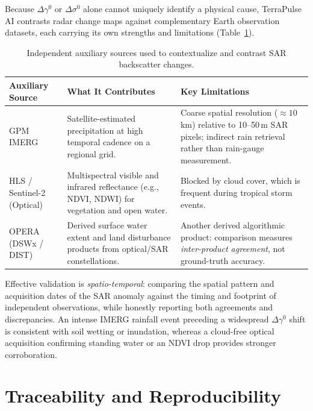 \documentclass[11pt,a4paper]{article}
\begin{document}
Because $\Delta\gamma^0$ or $\Delta\sigma^0$ alone cannot uniquely identify a physical cause, TerraPulse AI contrasts radar change maps against complementary Earth observation datasets, each carrying its own strengths and limitations (Table~\ref{tab:fuentes-aux}).

\begin{table}[htbp]
\centering\small
\begin{tabularx}{\linewidth}{p{.2\linewidth}p{.32\linewidth}X}
\toprule
\textbf{Auxiliary Source} & \textbf{What It Contributes} & \textbf{Key Limitations}\\\midrule
GPM IMERG & Satellite-estimated precipitation at high temporal cadence on a regional grid. & Coarse spatial resolution ($\approx 10$\,km) relative to 10--50\,m SAR pixels; indirect rain retrieval rather than rain-gauge measurement.\\
HLS / Sentinel-2 (Optical) & Multispectral visible and infrared reflectance (e.g., NDVI, NDWI) for vegetation and open water. & Blocked by cloud cover, which is frequent during tropical storm events.\\
OPERA (DSWx / DIST) & Derived surface water extent and land disturbance products from optical/SAR constellations. & Another derived algorithmic product: comparison measures \emph{inter-product agreement}, not ground-truth accuracy.\\\bottomrule
\end{tabularx}
\caption{Independent auxiliary sources used to contextualize and contrast SAR backscatter changes.}
\label{tab:fuentes-aux}
\end{table}

Effective validation is \emph{spatio-temporal}: comparing the spatial pattern and acquisition dates of the SAR anomaly against the timing and footprint of independent observations, while honestly reporting both agreements and discrepancies. An intense IMERG rainfall event preceding a widespread $\Delta\gamma^0$ shift is consistent with soil wetting or inundation, whereas a cloud-free optical acquisition confirming standing water or an NDVI drop provides stronger corroboration.

\section{Traceability and Reproducibility}
\label{sec:trazabilidad}
\end{document}
